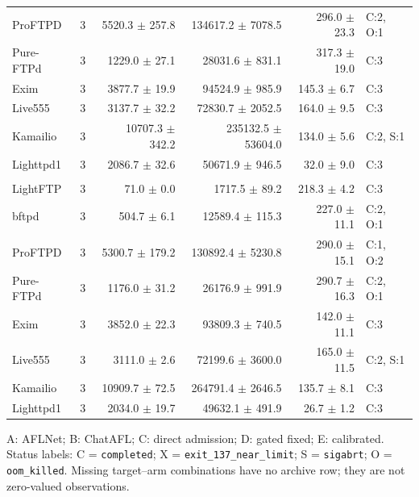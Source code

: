 \begin{minipage}[t]{0.49\linewidth}
\begin{tabular}{@{}lrrrrl@{}}
ProFTPD & 3 & 5520.3 $\pm$ 257.8 & 134617.2 $\pm$ 7078.5 & 296.0 $\pm$ 23.3 & C:2, O:1 \\
Pure-FTPd & 3 & 1229.0 $\pm$ 27.1 & 28031.6 $\pm$ 831.1 & 317.3 $\pm$ 19.0 & C:3 \\
Exim & 3 & 3877.7 $\pm$ 19.9 & 94524.9 $\pm$ 985.9 & 145.3 $\pm$ 6.7 & C:3 \\
Live555 & 3 & 3137.7 $\pm$ 32.2 & 72830.7 $\pm$ 2052.5 & 164.0 $\pm$ 9.5 & C:3 \\
Kamailio & 3 & 10707.3 $\pm$ 342.2 & 235132.5 $\pm$ 53604.0 & 134.0 $\pm$ 5.6 & C:2, S:1 \\
Lighttpd1 & 3 & 2086.7 $\pm$ 32.6 & 50671.9 $\pm$ 946.5 & 32.0 $\pm$ 9.0 & C:3 \\
\addlinespace[2pt]
\multicolumn{6}{@{}l}{\textbf{E -- $\gamma=1.0$}}\\
LightFTP & 3 & 71.0 $\pm$ 0.0 & 1717.5 $\pm$ 89.2 & 218.3 $\pm$ 4.2 & C:3 \\
bftpd & 3 & 504.7 $\pm$ 6.1 & 12589.4 $\pm$ 115.3 & 227.0 $\pm$ 11.1 & C:2, O:1 \\
ProFTPD & 3 & 5300.7 $\pm$ 179.2 & 130892.4 $\pm$ 5230.8 & 290.0 $\pm$ 15.1 & C:1, O:2 \\
Pure-FTPd & 3 & 1176.0 $\pm$ 31.2 & 26176.9 $\pm$ 991.9 & 290.7 $\pm$ 16.3 & C:2, O:1 \\
Exim & 3 & 3852.0 $\pm$ 22.3 & 93809.3 $\pm$ 740.5 & 142.0 $\pm$ 11.1 & C:3 \\
Live555 & 3 & 3111.0 $\pm$ 2.6 & 72199.6 $\pm$ 3600.0 & 165.0 $\pm$ 11.5 & C:2, S:1 \\
Kamailio & 3 & 10909.7 $\pm$ 72.5 & 264791.4 $\pm$ 2646.5 & 135.7 $\pm$ 8.1 & C:3 \\
Lighttpd1 & 3 & 2034.0 $\pm$ 19.7 & 49632.1 $\pm$ 491.9 & 26.7 $\pm$ 1.2 & C:3 \\
\bottomrule
\end{tabular}
\end{minipage}
\par\vspace{4pt}
\noindent\footnotesize A: AFLNet; B: ChatAFL; C: direct admission; D: gated fixed; E: calibrated. Status labels: C = \texttt{completed}; X = \texttt{exit\_137\_near\_limit}; S = \texttt{sigabrt}; O = \texttt{oom\_killed}. Missing target--arm combinations have no archive row; they are not zero-valued observations.
\endgroup
